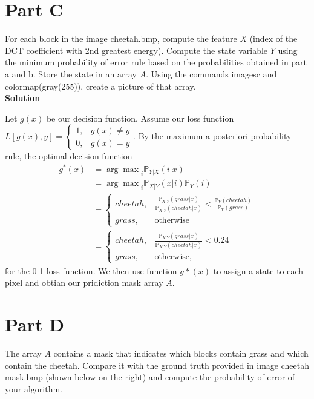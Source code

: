 \documentclass{article}
\newcommand*{\prob}{\mathds{P}}
\begin{document}
\pagebreak

\section*{Part C}

For each block in the image {\selectfont cheetah.bmp}, compute the feature $X$ (index of the DCT coefficient with
2nd greatest energy). Compute the state variable $Y$ using the minimum probability of error rule based
on the probabilities obtained in part a and b. Store the state in an array $A$. Using the commands {\selectfont imagesc} 
and {\selectfont colormap(gray(255))}, create a picture of that array. \\

\textbf{\large Solution}

Let $g(x)$ be our decision function. Assume our loss function 
$L[g(x), y] = \begin{cases}
  1, &g(x) \neq y \\
  0, &g(x) = y
\end{cases}$. 
By the maximum a-posteriori probability rule, the optimal decision function
\begin{align*}
  g^*(x) 
  &= {\arg \max}_{i} \prob_{Y|X}(i | x) \\
  &= {\arg \max}_{i} \prob_{X|Y}(x | i)\prob_Y(i) \\
  &= \begin{cases}
    cheetah, &\frac{\prob_{X|Y}(grass | x)}{\prob_{X|Y}(cheetah | x)} < \frac{\prob_Y(cheetah)}{\prob_Y(grass)} \\
    grass, &\text{otherwise}
  \end{cases} \\
  &= \begin{cases}
    cheetah, &\frac{\prob_{X|Y}(grass | x)}{\prob_{X|Y}(cheetah | x)} < 0.24 \\
    grass, &\text{otherwise},
  \end{cases}
\end{align*}
for the 0-1 loss function. We then use function $g*(x)$ to assign a state to each pixel and obtian 
our pridiction mask array $A$.

\section*{Part D}

The array $A$ contains a mask that indicates which blocks contain grass and which contain the
cheetah. Compare it with the ground truth provided in image cheetah mask.bmp (shown below on the
right) and compute the probability of error of your algorithm. \\
\end{document}
